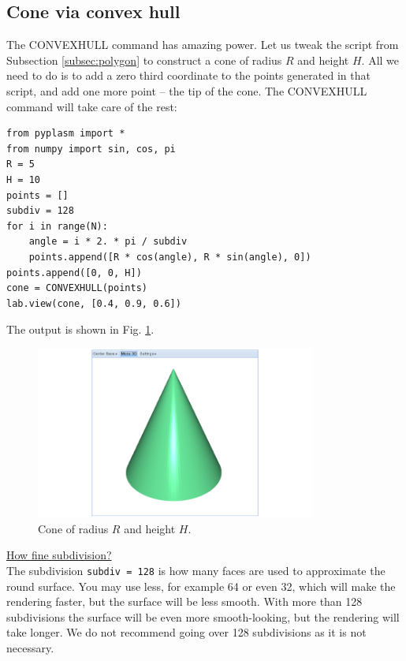 \documentclass{article}
\begin{document}
\subsection{Cone via convex hull}\label{par:coco}

The CONVEXHULL command has amazing power. Let us tweak the script
from Subsection \ref{subsec:polygon} to construct a cone of radius
$R$ and height $H$. All we need to do is to add a zero third coordinate 
to the points generated in that script, and add one more point -- the 
tip of the cone. The CONVEXHULL command will take care of the rest:

\begin{verbatim}
from pyplasm import *
from numpy import sin, cos, pi
R = 5
H = 10
points = []
subdiv = 128
for i in range(N):
    angle = i * 2. * pi / subdiv
    points.append([R * cos(angle), R * sin(angle), 0])
points.append([0, 0, H])
cone = CONVEXHULL(points)
lab.view(cone, [0.4, 0.9, 0.6])
\end{verbatim}
\noindent
The output is shown in Fig. \ref{fig:convexhull-2}.

\begin{figure}[!ht]
\begin{center}
\includegraphics[width=0.82\textwidth]{img/convexhull-2.png}
\end{center}
\vspace{-2mm}
\caption{Cone of radius $R$ and height $H$.}
\label{fig:convexhull-2}
\end{figure}
\noindent
\underline{How fine subdivision?}\\

\noindent
The subdivision {\tt subdiv = 128} is how many
faces are used to approximate the round surface. You may use less, 
for example 64 or even 32, which will make the rendering faster, but
the surface will be less smooth. With more than 
128 subdivisions the surface will be even more smooth-looking, but 
the rendering will take longer. We do not recommend going over 128 
subdivisions as it is not necessary.
\end{document}
